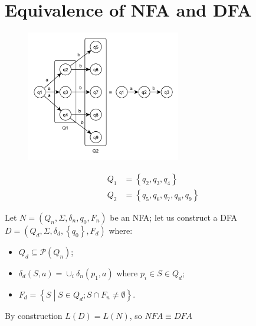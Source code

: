 \section{Equivalence of NFA and DFA}
\begin{figure}[H]
    \centerline{\includegraphics[width=0.6\textwidth]{img/1.pdf}}
\end{figure}
\begin{align*}
	Q_1 &= \left\{q_2, q_3, q_4\right\}\\
	Q_2 &= \left\{q_5, q_6, q_7, q_8, q_9\right\}
\end{align*}

Let $N = (Q_n, \Sigma, \delta_n, q_0, F_n)$ be an NFA; let us construct a DFA $D = (Q_d, \Sigma, \delta_d, \left\{q_0\right\}, F_d)$ where:
\begin{itemize}
	\item $Q_d \subseteq \mathscr{P}(Q_n)$;
	\item $\delta_d(S, a) = \cup_i \delta_n(p_1, a)$ where $p_i \in S \in Q_d$;
	\item $F_d = \left\{S \middle| S \in Q_d; S \cap F_n \neq \emptyset \right\}$.
\end{itemize}
By construction $L(D) = L(N)$, so $NFA \equiv DFA$

